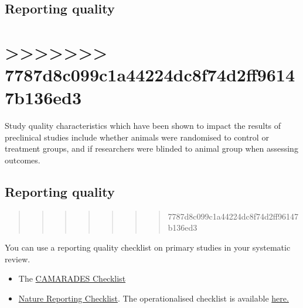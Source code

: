 \documentclass[
]{book}
\providecommand{\tightlist}{%
  \setlength{\itemsep}{0pt}\setlength{\parskip}{0pt}}
\begin{document}
\hypertarget{reporting-quality}{%
\section{Reporting quality}\label{reporting-quality}}

\hypertarget{d8c099c1a44224dc8f74d2ff96147b136ed3}{%
\chapter{\textgreater\textgreater\textgreater\textgreater\textgreater\textgreater\textgreater{} 7787d8c099c1a44224dc8f74d2ff96147b136ed3}\label{d8c099c1a44224dc8f74d2ff96147b136ed3}}

Study quality characteristics which have been shown to impact the results of preclinical studies include whether animals were randomised to control or treatment groups, and if researchers were blinded to animal group when assessing outcomes.

\hypertarget{reporting-quality-1}{%
\section{Reporting quality}\label{reporting-quality-1}}

\begin{quote}
\begin{quote}
\begin{quote}
\begin{quote}
\begin{quote}
\begin{quote}
\begin{quote}
7787d8c099c1a44224dc8f74d2ff96147b136ed3
\end{quote}
\end{quote}
\end{quote}
\end{quote}
\end{quote}
\end{quote}
\end{quote}

You can use a reporting quality checklist on primary studies in your systematic review.

\begin{itemize}
\tightlist
\item
  The \href{https://www.ahajournals.org/doi/pdf/10.1161/01.str.0000125719.25853.20}{CAMARADES Checklist}
\item
  \href{https://www.gene-quantification.de/checklist-for-life-sciences-articles.pdf}{Nature Reporting Checklist}. The operationalised checklist is available \href{https://link.springer.com/article/10.1007/s11192-016-1964-8/tables/6}{here.}
\end{itemize}
\end{document}
